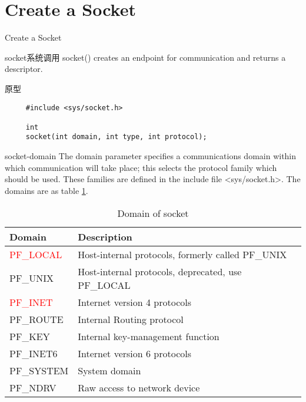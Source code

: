 \documentclass{beamer}
\begin{document}
\section{Create a Socket}
\begin{frame}
\Huge{\centerline{Create a Socket}}
\end{frame}
\begin{frame}[fragile]{socket系统调用}
socket() creates an endpoint for communication and returns a descriptor.
\begin{block}{原型}
\begin{verbatim}
     #include <sys/socket.h>

     int
     socket(int domain, int type, int protocol);
\end{verbatim}
\end{block}
\end{frame}
\begin{frame}{socket-domain}
     The domain parameter specifies a communications domain within which communication will take place; this selects the protocol family which should be used.  These families are defined in
     the include file <sys/socket.h>.  The domains are as table \ref{skt-dm}.
\begin{table}
\begin{tabular}{ll}
\toprule
\textbf{Domain}&\textbf{Description}\\
\midrule
           \textcolor{red}{PF\_LOCAL}    &    Host-internal protocols, formerly called PF\_UNIX\\
           PF\_UNIX    &     Host-internal protocols, deprecated, use PF\_LOCAL\\
           \textcolor{red}{PF\_INET}       &  Internet version 4 protocols\\
           PF\_ROUTE   &     Internal Routing protocol\\
           PF\_KEY         & Internal key-management function\\
           PF\_INET6       & Internet version 6 protocols\\
           PF\_SYSTEM    &   System domain\\
           PF\_NDRV        & Raw access to network device\\
           \bottomrule
           \end{tabular}
\caption{Domain of socket}
\label{skt-dm}
\end{table}

\end{frame}
\end{document}
